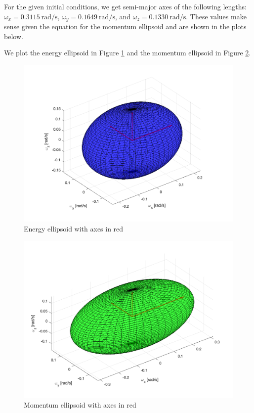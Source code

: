 For the given initial conditions, we get semi-major axes of the following lengths: $\omega_{x} = \qty{0.3115}{\radian\per\second}$, $\omega_{y} = \qty{0.1649}{\radian\per\second}$, and $\omega_{z} = \qty{0.1330}{\radian\per\second}$. These values make sense given the equation for the momentum ellipsoid and are shown in the plots below.

We plot the energy ellipsoid in Figure \ref{fig:ps2_problem6_energy} and the momentum ellipsoid in Figure \ref{fig:ps2_problem6_momentum}.

\begin{figure}[H]
\centering
\includegraphics[scale=0.5]{Images/ps2_problem6_energy.png}
\caption{Energy ellipsoid with axes in red}
\label{fig:ps2_problem6_energy}
\end{figure}

\begin{figure}[H]
\centering
\includegraphics[scale=0.5]{Images/ps2_problem6_momentum.png}
\caption{Momentum ellipsoid with axes in red}
\label{fig:ps2_problem6_momentum}
\end{figure}


